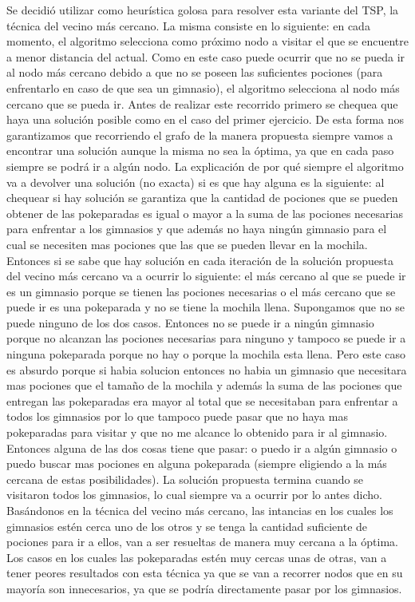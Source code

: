         Se decidió utilizar como heurística golosa para resolver esta variante del TSP, la técnica del vecino más cercano. La misma consiste en lo siguiente: en cada momento, el algoritmo selecciona como próximo nodo a visitar el que se encuentre a menor distancia del actual. Como en este caso puede ocurrir que no se pueda ir al nodo más cercano debido a que no se poseen las suficientes pociones (para enfrentarlo en caso de que sea un gimnasio), el algoritmo selecciona al nodo más cercano que se pueda ir. Antes de realizar este recorrido primero se chequea que haya una solución posible como en el caso del primer ejercicio. De esta forma nos garantizamos que recorriendo el grafo de la manera propuesta siempre vamos a encontrar una solución aunque la misma no sea la óptima, ya que en cada paso siempre se podrá ir a algún nodo. La explicación de por qué siempre el algoritmo va a devolver una solución (no exacta) si es que hay alguna es la siguiente: al chequear si hay solución se garantiza que la cantidad de pociones que se pueden obtener de las pokeparadas es igual o mayor a la suma de las pociones necesarias para enfrentar a los gimnasios y que además no haya ningún gimnasio para el cual se necesiten mas pociones que las que se pueden llevar en la mochila. Entonces si se sabe que hay solución en cada iteración de la solución propuesta del vecino más cercano va a ocurrir lo siguiente: el más cercano al que se puede ir es un gimnasio porque se tienen las pociones necesarias o el más cercano que se puede ir es una pokeparada y no se tiene la mochila llena. Supongamos que no se puede ninguno de los dos casos. Entonces no se puede ir a ningún gimnasio porque no alcanzan las pociones necesarias para ninguno y tampoco se puede ir a ninguna pokeparada porque no hay o porque la mochila esta llena. Pero este caso es absurdo porque si habia solucion entonces no habia un gimnasio que necesitara mas pociones que el tamaño de la mochila y además la suma de las pociones que entregan las pokeparadas era mayor al total que se necesitaban para enfrentar a todos los gimnasios por lo que tampoco puede pasar que no haya mas pokeparadas para visitar y que no me alcance lo obtenido para ir al gimnasio. Entonces alguna de las dos cosas tiene que pasar: o puedo ir a algún gimnasio o puedo buscar mas pociones en alguna pokeparada (siempre eligiendo a la más cercana de estas posibilidades). La solución propuesta termina cuando se visitaron todos los gimnasios, lo cual siempre va a ocurrir por lo antes dicho. 
        Basándonos en la técnica del vecino más cercano, las intancias en los cuales los gimnasios estén cerca uno de los otros y se tenga la cantidad suficiente de pociones para ir a ellos, van a ser resueltas de manera muy cercana a la óptima. Los casos en los cuales las pokeparadas estén muy cercas unas de otras, van a tener peores resultados con esta técnica ya que se van a recorrer nodos que en su mayoría son innecesarios, ya que se podría directamente pasar por los gimnasios.


